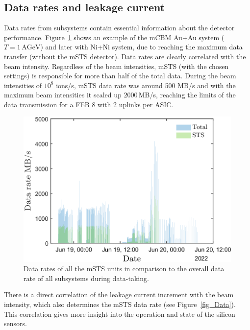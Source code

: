\subsection{Data rates and leakage current}
Data rates from subsystems contain essential information about the detector performance. Figure~\ref{fig_data_rates_Ag} shows an example of the \gls{mCBM} Au+Au system ($T= 1\,\mathrm{AGeV}$) and later with Ni+Ni system, due to reaching the maximum data transfer (without the \gls{mSTS} detector). Data rates are clearly correlated with the beam intensity. Regardless of the beam intensities, \gls{mSTS} (with the chosen settings) is responsible for more than half of the total data. During the beam intensities of $10^{8}$ ions/s, \gls{mSTS} data rate was around 500 MB/s and with the maximum beam intensities it scaled up $2000$\,MB/s, reaching the limits of the data transmission for a \gls{FEB} 8 with 2 uplinks per \gls{ASIC}. 
\begin{figure}[H]
\centering
\includegraphics[width=0.6\columnwidth]{Chapter6/DCS/images/rates/Ag_total.png}
\caption{Data rates of all the \gls{mSTS} units in comparison to the overall data rate of all subsystems during data-taking.}
\label{fig_data_rates_Ag}
\end{figure}
There is a direct correlation of the leakage current increment with the beam intensity, which also determines the \gls{mSTS} data rate (see Figure~\ref{fig_Data}). This correlation gives more insight into the operation and state of the silicon sensors.
